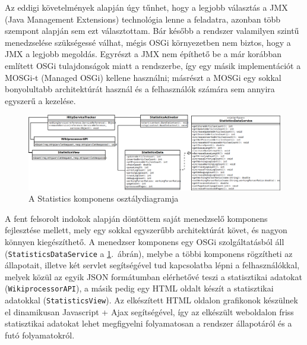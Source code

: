 Az eddigi követelmények alapján úgy tűnhet, hogy a legjobb választás a JMX (Java Management Extensions) technológia lenne a feladatra, azonban több szempont alapján sem ezt választottam. Bár később a rendszer valamilyen szintű menedzselése szükségessé válhat, mégis OSGi környezetben nem biztos, hogy a JMX a legjobb megoldás. Egyrészt a JMX nem építhető be a már korábban említett OSGi tulajdonságok miatt a rendszerbe, így egy másik implementációt a MOSGi-t (Managed OSGi) kellene használni; másrészt a MOSGi egy sokkal bonyolultabb architektúrát használ és a felhasználók számára sem annyira egyszerű a kezelése.

\begin{figure}[htp]
\centering
\includegraphics[scale=0.3]{img/class_statistics}
\caption{A Statistics komponens osztálydiagramja}
\label{fig:class_statistics}
\end{figure}

A fent felsorolt indokok alapján döntöttem saját menedzselő komponens fejlesztése mellett, mely egy sokkal egyszerűbb architektúrát követ, és nagyon könnyen kiegészíthető. A menedzser komponens egy OSGi szolgáltatásból áll (\texttt{StatisticsDataService} a \ref{fig:class_statistics}.~ábrán), melybe a többi komponens rögzítheti az állapotait, illetve két servlet segítségével tud kapcsolatba lépni a felhasználókkal, melyek közül az egyik JSON formátumban elérhetővé teszi a statisztikai adatokat (\texttt{WikiprocessorAPI}), a másik pedig egy HTML oldalt készít a statisztikai adatokkal (\texttt{StatisticsView}). Az elkészített HTML oldalon grafikonok készülnek el dinamikusan Javascript + Ajax segítségével, így az elkészült weboldalon friss statisztikai adatokat lehet megfigyelni folyamatosan a rendszer állapotáról és a futó folyamatokról.

